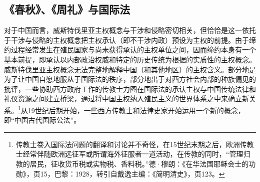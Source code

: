 \documentclass[a4paper, 12pt, openright]{ctexbook}
\begin{document}
\subsection{《春秋》、《周礼》与国际法}

对于中国而言，威斯特伐里亚主权概念与干涉和侵略密切相关，但恰恰是这一依托于干涉与侵略的主权概念把主权承认（即不干涉内政）预设为主权的前提。由于缔约过程经常发生在殖民国家与尚未获得承认的主权单位之间，因而缔约本身有一个基本前提，即承认以内部政治权威和特定的历史传统为根据的实质性的主权概念。威斯特伐里亚主权概念无法完整地解释中国（和其他地区）的主权含义。部分地是为了让中国自愿地服从于国际法的秩序，部分地出于对西方社会内部的种族偏见的批评，一些协助西方政府工作的传教士力图在国际法的承认主权与中国传统法律和礼仪资源之间建立桥梁，通过将中国主权纳入殖民主义的世界体系之中来确立新关系。\footnote{传教士卷入国际法问题的翻译和讨论并不奇怪，在15世纪末期之后，欧洲传教士经常伴随欧洲远征军或所谓海外征服者一道活动，在传教的同时，“管理归教的居民，征收货币税或实物税、香料税。”德·穆朗：《在华法国耶稣会士的功勋》，页15，巴黎：1928，转引自戴逸主编：《简明清史》，页123。}从19世纪后期开始，一些西方传教士和法律史家开始运用一个新的概念，即“中国古代国际公法”。
\end{document}
